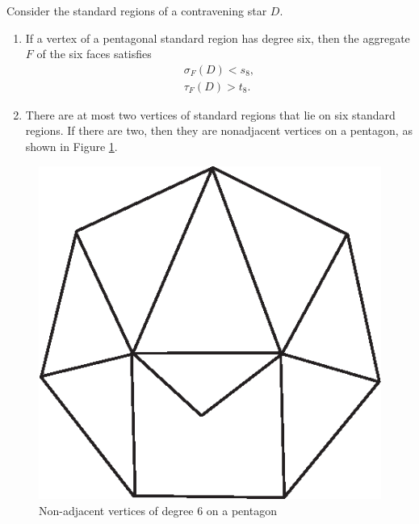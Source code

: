 \begin{lemma}
    \label{lemma:aggregate6}
    Consider the standard regions of a contravening star $D$.
    \begin{enumerate}
    \item If a vertex of a pentagonal standard region has degree six,
    then the aggregate $F$ of the six faces satisfies
            $$
            \begin{array}{lll}
            \sigma_F(D) < s_8,\\
            \tau_F(D) > t_8.
            \end{array}
            $$
    \item There are at most two vertices of standard regions
    that lie on six standard regions.   If
        there are two, then they are nonadjacent vertices on a
        pentagon, as shown in Figure \ref{fig:doubledegree6}.
    \end{enumerate}
\end{lemma}
\begin{figure}[htb]
  \centering
  \includegraphics{PS/doubledegree6.eps}
  \caption{Non-adjacent vertices of degree $6$ on a pentagon}
  \label{fig:doubledegree6}
\end{figure}

